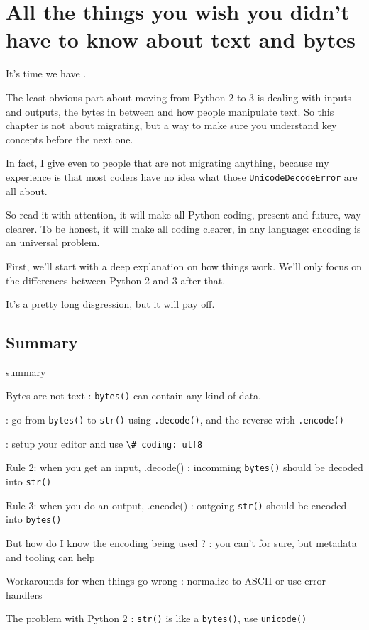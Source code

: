 \chapter{All the things you wish you didn't have to know about text and bytes}\label{chap:text_and_bytes}

It's time we have .

The least obvious part about moving from Python 2 to 3 is dealing with inputs and outputs, the bytes in between and how people manipulate text. So this chapter is not about migrating, but a way to make sure you understand key concepts before the next one.

In fact, I give  even to people that are not migrating anything, because my experience is that most coders have no idea what those \lstinline{UnicodeDecodeError} are all about.

So read it with attention, it will make all Python coding, present and future, way clearer. To be honest, it will make all coding clearer, in any language: encoding is an universal problem.

First, we'll start with a deep explanation on how things work. We'll only focus on the differences between Python 2 and 3 after that.

It's a pretty long disgression, but it will pay off.

\section{Summary}

\begin{labeling}{summary}
    \item [Bytes are not text]: \lstinline{bytes()} can contain any kind of data.
    \item [str() for manipulating text]: go from \lstinline{bytes()} to \lstinline{str()} using \lstinline{.decode()}, and the reverse with \lstinline{.encode()}
    \item [Rule 1: your code files should be in UTF-8]: setup your editor and use \lstinline{\# coding: utf8}
    \item [Rule 2: when you get an input, .decode()]: incomming \lstinline{bytes()} should be decoded into \lstinline{str()}
    \item [Rule 3: when you do an output, .encode()]: outgoing \lstinline{str()} should be encoded into \lstinline{bytes()}
    \item [But how do I know the encoding being used ?]: you can't for sure, but metadata and tooling can help
    \item [Workarounds for when things go wrong]: normalize to ASCII or use error handlers
    \item [The problem with Python 2]: \lstinline{str()} is like a \lstinline{bytes()}, use \lstinline{unicode()}
\end{labeling}


